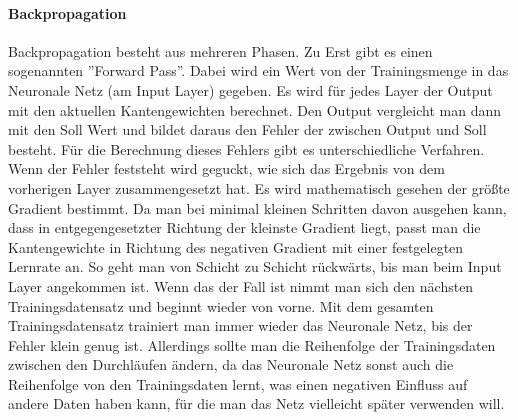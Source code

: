 \documentclass{hbrs-ecta-report}
\begin{document}
\paragraph{Backpropagation}
Backpropagation besteht aus mehreren Phasen. Zu Erst gibt es einen sogenannten ''Forward Pass''. Dabei wird ein Wert von der Trainingsmenge in das Neuronale Netz (am Input Layer) gegeben. Es wird für jedes Layer der Output mit den aktuellen Kantengewichten berechnet. Den Output vergleicht man dann mit den Soll Wert und bildet daraus den Fehler der zwischen Output und Soll besteht. Für die Berechnung dieses Fehlers gibt es unterschiedliche Verfahren. \\
Wenn der Fehler feststeht wird geguckt, wie sich das Ergebnis von dem vorherigen Layer zusammengesetzt hat. Es wird mathematisch gesehen der größte Gradient bestimmt. Da man bei minimal kleinen Schritten davon ausgehen kann, dass in entgegengesetzter Richtung der kleinste Gradient liegt, passt man die Kantengewichte in Richtung des negativen Gradient mit einer festgelegten Lernrate an. So geht man von Schicht zu Schicht rückwärts, bis man beim Input Layer angekommen ist.
Wenn das der Fall ist nimmt man sich den nächsten Trainingsdatensatz und beginnt wieder von vorne. Mit dem gesamten Trainingsdatensatz trainiert man immer wieder das Neuronale Netz, bis der Fehler klein genug ist. Allerdings sollte man die Reihenfolge der Trainingsdaten zwischen den Durchläufen ändern, da das Neuronale Netz sonst auch die Reihenfolge von den Trainingsdaten lernt, was einen negativen Einfluss auf andere Daten haben kann, für die man das Netz vielleicht später verwenden will.
\end{document}
